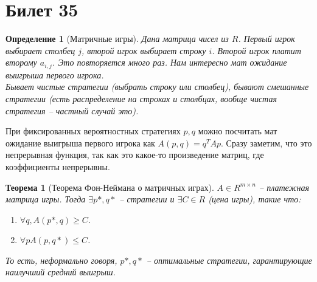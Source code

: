 \documentclass[12pt, letterpaper]{article}
\newtheorem{theorem}{Теорема}[section]
\newtheorem{defi}{Определение}[section]
\begin{document}
\section{Билет 35}
\begin{defi}[Матричные игры]
Дана матрица чисел из $R$. Первый игрок выбирает столбец $j$, второй игрок выбирает строку $i$. Второй игрок платит второму $a_{i,j}$. Это повторяется много раз. Нам интересно мат ожидание выигрыша первого игрока. \\
Бывает чистые стратегии (выбрать строку или столбец), бывают смешанные стратегии (есть распределение на строках и столбцах, вообще чистая стратегия -- частный случай это). 
\end{defi}
При фиксированных вероятностных стратегиях $p,q$ можно посчитать мат ожидание выигрыша первого игрока как $A(p, q) = q^T A p$. Сразу заметим, что это непрерывная функция, так как это какое-то произведение матриц, где коэффициенты непрерывны.
\begin{theorem}[Теорема Фон-Неймана о матричных играх]
$A \in R^{m \times n}$ -- платежная матрица игры. Тогда $\exists p*, q*$ -- стратегии и $\exists C \in R$ (цена игры), такие что:
\begin{enumerate}
\item $\forall q, A(p*, q) \geq C$. 
\item $\forall p A(p, q*) \leq C$.
\end{enumerate}
То есть, неформально говоря, $p*, q*$ -- оптимальные стратегии, гарантирующие наилучший средний выигрыш.	
\end{theorem}
\end{document}
